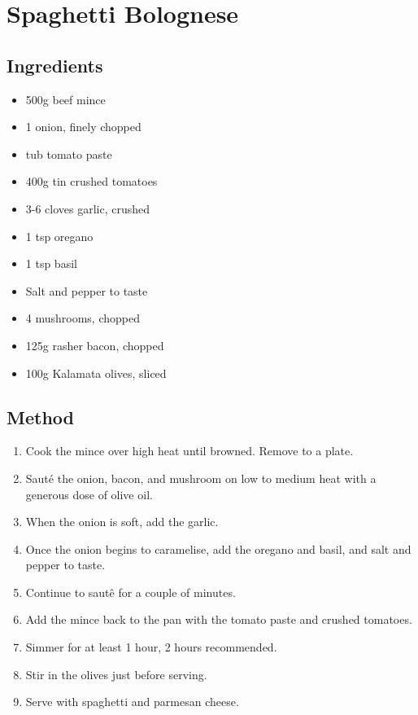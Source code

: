 \section{Spaghetti Bolognese}


\begin{multicols}{2}
  \subsection{Ingredients}
    \begin{itemize}
      \item 500g beef mince
      \item 1 onion, finely chopped
      \item {} tub tomato paste
      \item 400g tin crushed tomatoes
      \item 3-6 cloves garlic, crushed
      \item 1 tsp oregano
      \item 1 tsp basil
      \item Salt and pepper to taste
      \item 4 mushrooms, chopped
      \item 125g rasher bacon, chopped
      \item 100g Kalamata olives, sliced
    \end{itemize}
  \vfill\null
  \columnbreak
  \subsection{Method}
    \begin{enumerate}
      \item Cook the mince over high heat until browned. Remove to a plate.
      \item Saut\'e the onion, bacon, and mushroom on low to medium heat with a generous dose of olive oil.
      \item When the onion is soft, add the garlic.
      \item Once the onion begins to caramelise, add the oregano and basil, and salt and pepper to taste.
      \item Continue to saut\^e for a couple of minutes.
      \item Add the mince back to the pan with the tomato paste and crushed tomatoes.
      \item Simmer for at least 1 hour, 2 hours recommended.
      \item Stir in the olives just before serving.
      \item Serve with spaghetti and parmesan cheese.
    \end{enumerate}
  \end{multicols}
